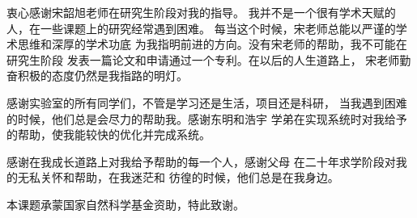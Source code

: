 
\begin{acknowledgements}
  衷心感谢宋韶旭老师在研究生阶段对我的指导。
  我并不是一个很有学术天赋的人，在一些课题上的研究经常遇到困难。
  每当这个时候，宋老师总能以严谨的学术思维和深厚的学术功底
  为我指明前进的方向。没有宋老师的帮助，我不可能在研究生阶段
  发表一篇论文和申请通过一个专利。在以后的人生道路上，
  宋老师勤奋积极的态度仍然是我指路的明灯。

  感谢实验室的所有同学们，不管是学习还是生活，项目还是科研，
  当我遇到困难的时候，他们总是会尽力的帮助我。感谢东明和浩宇
  学弟在实现系统时对我给予的帮助，使我能较快的优化并完成系统。

  感谢在我成长道路上对我给予帮助的每一个人，感谢父母
  在二十年求学阶段对我的无私关怀和帮助，在我迷茫和
  彷徨的时候，他们总是在我身边。

  本课题承蒙国家自然科学基金资助，特此致谢。
\end{acknowledgements}
